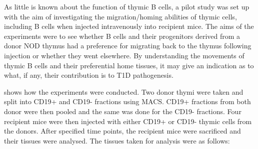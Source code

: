 As little is known about the function of thymic B cells, a pilot study was set up with the aim of investigating the migration/homing abilities of thymic cells, including B cells when injected intravenously into recipient mice.
The aims of the experiments were to see whether B cells and their progenitors derived from a donor NOD thymus had a preference for migrating back to the thymus following injection or whether they went elsewhere.
By understanding the movements of thymic B cells and their preferential home tissues, it may give an indication as to what, if any, their contribution is to T1D pathogenesis.

 shows how the experiments were conducted. 
Two donor thymi were taken and split into CD19+ and CD19- fractions using MACS.
CD19+ fractions from both donor were then pooled and the same was done for the CD19- fractions.
Four recipient mice were then injected with either CD19+ or CD19- thymic cells from the donors.
After specified time points, the recipient mice were sacrificed and their tissues were analysed.
The tissues taken for analysis were as follows:
